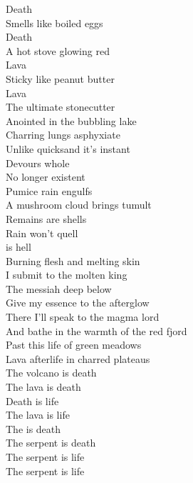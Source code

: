 


Death \\
Smells like boiled eggs \\
Death \\
A hot stove glowing red \\
Lava \\
Sticky like peanut butter \\
Lava \\
The ultimate stonecutter \\

Anointed in the bubbling lake \\
Charring lungs asphyxiate \\
Unlike quicksand it's instant \\
Devours whole \\
No longer existent \\
Pumice rain engulfs \\
A mushroom cloud brings tumult \\
Remains are shells \\
Rain won't quell \\
 is hell \\

Burning flesh and melting skin \\
I submit to the molten king \\
The messiah deep below \\
Give my essence to the afterglow \\
There I'll speak to the magma lord \\
And bathe in the warmth of the red fjord \\
Past this life of green meadows \\
Lava afterlife in charred plateaus \\

The volcano is death \\
The lava is death \\
Death is life \\
The lava is life \\

The  is death \\
The serpent is death \\
The serpent is life \\
The serpent is life \\

